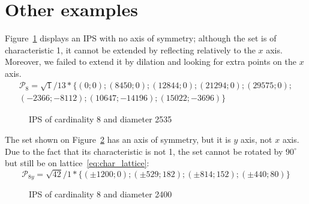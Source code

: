 \documentclass[12pt]{article}
\theoremstyle{theorem}
\theoremstyle{dfn}
\theoremstyle{remark}
\begin{document}
\section{Other examples}

Figure~\ref{8_2535_1_d680} displays an IPS with
no axis of symmetry;
although the set is of characteristic 1,
it cannot be extended by reflecting relatively to the $x$ axis.
Moreover, we failed to extend it by dilation and looking for extra points on the $x$ axis.
%
%
\begin{multline}
	\mathcal{P}_8=
	\sqrt{1}/13*
	\{
	( 0 ; 0);
	( 8450 ; 0);
	( 12844 ; 0);
	( 21294 ; 0);
	( 29575 ; 0);
	\\
	( -2366 ; -8112);
	( 10647 ; -14196);
	( 15022 ; -3696)
	\}
\end{multline}
%
\begin{figure}[h!]
\parbox{1\linewidth}{\caption{IPS of cardinality 8 and diameter 2535}
\label{8_2535_1_d680}}
\end{figure}

The set shown on Figure~\ref{8_2400_42_56f3} has an axis of symmetry, but it is $y$ axis, not $x$ axis.
Due to the fact that its characteristic is not 1,
the set cannot be rotated by $90^\circ$ but still be on lattice~\eqref{eq:char_lattice}:
\begin{equation}
	\mathcal{P}_{8y}=
	\sqrt{42}/1*\{( \pm1200 ; 0);
	( \pm529 ; 182);
	( \pm814 ; 152);
	( \pm440 ; 80)
	\}
\end{equation}

\begin{figure}[h!]
	\parbox{1\linewidth}{\caption{IPS of cardinality 8 and diameter 2400}
	\label{8_2400_42_56f3}}
\end{figure}
\end{document}
